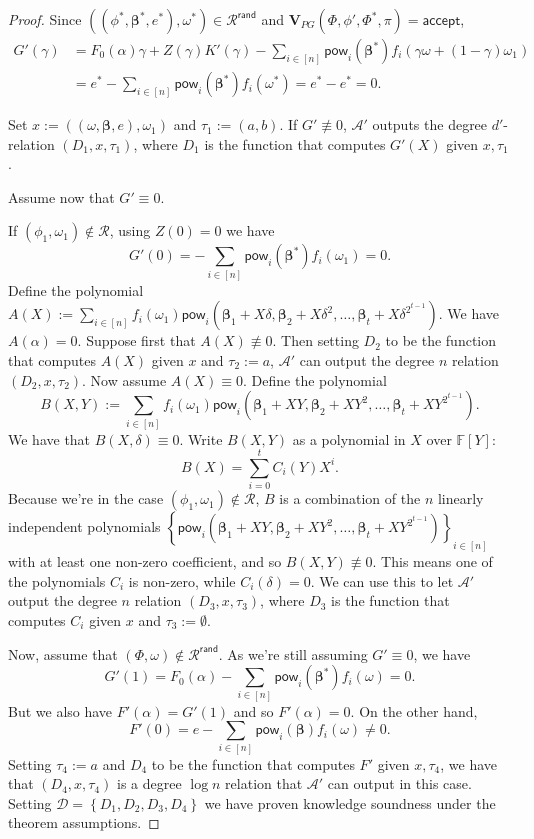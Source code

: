 \documentclass[11pt]{article} %
\newcommand{\F}{\ensuremath{\mathbb F}\xspace}
\newcommand{\advprime}{\ensuremath{\mathcal{A}'}\xspace}
\newcommand{\acc}{\ensuremath{\mathsf{accept}}\xspace}
\newcommand{\defeq}{:=}
\newcommand{\sett}[2]{\ensuremath{\set{#1}_{#2}}\xspace}
\newcommand{\prf}{\ensuremath{\mathsf{\pi}}\xspace}
\newcommand{\inst}{\ensuremath{\phi}\xspace}
\newcommand{\wit}{\ensuremath{\mathsf{\omega}}\xspace}
\newcommand{\ver}{\ensuremath{\mathsf{\mathbf{V}}}\xspace}
\newcommand{\rel}{\ensuremath{\mathcal{R}}\xspace}
\newcommand{\relrand}{\ensuremath{\mathcal{R^{\mathsf{rand}}}}\xspace}
\newcommand{\set}[1]{\ensuremath{\left\{#1\right\}}\xspace}
\newcommand{\sumi}[1]{\sum_{i\in[#1]}}
\newcommand{\betaa}{\ensuremath{\mathbf{\boldsymbol{\beta}}}\xspace}
\newcommand{\instt}{\ensuremath{\Phi^*}\xspace}
\newcommand{\insttbase}{\ensuremath{\Phi}\xspace}
\newcommand{\pow}{\ensuremath{\mathsf{pow}}\xspace}
\newcommand{\inststar}{\ensuremath{\inst^*}\xspace}
\newcommand{\witstar}{\ensuremath{\wit^*}\xspace}
\newcommand{\ztafuncs}{\ensuremath{\mathcal{D}}\xspace}
\begin{document}
\begin{proof}
Since $((\inststar,\betaa^*,e^*),\witstar)\in \relrand$ and $\ver_{PG}(\insttbase,\inst',\instt,\prf)=\acc$,
\begin{align*}
G'(\gamma) &= F_0(\alpha)\gamma + Z(\gamma)K'(\gamma)- \sum_{i\in [n]} \pow_i(\betaa^*) f_i(\gamma\wit +(1-\gamma)\wit_1) \\
           &= e^*-\sum_{i\in [n]} \pow_i(\betaa^*) f_i(\witstar) = e^*-e^* = 0.
\end{align*}

Set $x\defeq ((\wit,\betaa,e),\wit_1)$ and $\tau_1\defeq (a,b)$.
If $G'\not\equiv 0$, \advprime outputs the degree $d'$-relation $(D_1,x,\tau_1)$,
where $D_1$ is the function that computes $G'(X)$ given $x,\tau_1$.

Assume now that $G'\equiv 0$.

If $(\inst_1,\wit_1)\notin \rel$, using $Z(0)=0$ we have 
\[G'(0)= -\sum_{i\in [n]}\pow_i( \betaa^*) f_i(\wit_1)=0.\]
Define the polynomial $A(X)\defeq \sumi{n}f_i(\wit_1)\pow_i(\betaa_1+X \delta,\betaa_2 +X \delta^2,\ldots,\betaa_t+X \delta^{2^{t-1}})$.
We have $A(\alpha)=0$. Suppose first that $A(X)\not\equiv 0$. Then setting $D_2$ to be the function that computes $A(X)$ given $x$ and $\tau_2\defeq a$, \advprime can output the degree $n$ relation $(D_2,x,\tau_2)$. Now assume $A(X)\equiv 0$.
Define the polynomial 
\[B(X,Y)\defeq \sumi{n}f_i(\wit_1)\pow_i(\betaa_1+XY,\betaa_2+XY^2,\ldots,\betaa_t+X Y^{2^{t-1}}).\]
We have that $B(X,\delta)\equiv 0$.
Write $B(X,Y)$ as a polynomial in $X$ over $\F[Y]$:
\[B(X)=\sum_{i=0}^t C_i(Y)X^i.\]
Because we're in the case $(\inst_1,\wit_1)\notin \rel$, $B$ is a combination of the $n$ linearly independent polynomials $\sett{\pow_i(\betaa_1+XY,\betaa_2+XY^2,\ldots,\betaa_t+X Y^{2^{t-1}})}{i\in [n]}$ with at least one non-zero coefficient, and so $B(X,Y)\not\equiv 0$. This means one of the polynomials $C_i$ is non-zero, while $C_i(\delta)=0$.
We can use this to let \advprime output the degree $n$ relation $(D_3,x,\tau_3)$, where $D_3$ is the function that computes $C_i$ given $x$ and $\tau_3\defeq\emptyset$.

Now, assume that $(\insttbase,\wit)\notin \relrand$.
As we're still assuming $G'\equiv 0$, we have 
\[G'(1)=F_0(\alpha)-\sumi{n}\pow_i(\betaa^*) f_i(\wit)=0.\]
But we also have $F'(\alpha)=G'(1)$ and so $F'(\alpha)=0$.
On the other hand,
\[F'(0)=e-\sumi{n}\pow_i(\betaa) f_i(\wit)\neq 0.\]
Setting $\tau_4\defeq a$ and $D_4$ to be the function that computes $F'$ given $x,\tau_4$, we
have that $(D_4,x,\tau_4)$ is a degree $\log n$ relation that \advprime can output in this case.
Setting $\ztafuncs=\set{D_1,D_2,D_3,D_4}$ we have proven knowledge soundness under the theorem assumptions.
\end{proof}
\end{document}

